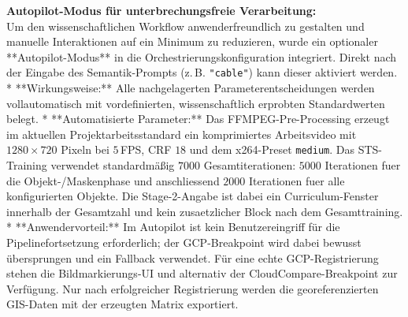 \documentclass[12pt,a4paper]{article}
\begin{document}
\textbf{Autopilot-Modus für unterbrechungsfreie Verarbeitung:}\\
Um den wissenschaftlichen Workflow anwenderfreundlich zu gestalten und manuelle Interaktionen auf ein Minimum zu reduzieren, wurde ein optionaler **Autopilot-Modus** in die Orchestrierungskonfiguration integriert. Direkt nach der Eingabe des Semantik-Prompts (z.\,B. \texttt{"cable"}) kann dieser aktiviert werden. 
*   **Wirkungsweise:** Alle nachgelagerten Parameterentscheidungen werden vollautomatisch mit vordefinierten, wissenschaftlich erprobten Standardwerten belegt. 
*   **Automatisierte Parameter:** Das FFMPEG-Pre-Processing erzeugt im aktuellen Projektarbeitsstandard ein komprimiertes Arbeitsvideo mit $1280 \times 720$ Pixeln bei $5$\,FPS, CRF $18$ und dem x264-Preset \texttt{medium}. Das STS-Training verwendet standardmäßig $7000$ Gesamtiterationen: $5000$ Iterationen fuer die Objekt-/Maskenphase und anschliessend $2000$ Iterationen fuer alle konfigurierten Objekte. Die Stage-2-Angabe ist dabei ein Curriculum-Fenster innerhalb der Gesamtzahl und kein zusaetzlicher Block nach dem Gesamttraining.
*   **Anwendervorteil:** Im Autopilot ist kein Benutzereingriff für die
Pipelinefortsetzung erforderlich; der GCP-Breakpoint wird dabei bewusst
übersprungen und ein Fallback verwendet. Für eine echte GCP-Registrierung
stehen die Bildmarkierungs-UI und alternativ der CloudCompare-Breakpoint
zur Verfügung. Nur nach erfolgreicher Registrierung werden die
georeferenzierten GIS-Daten mit der erzeugten Matrix exportiert.
\end{document}
